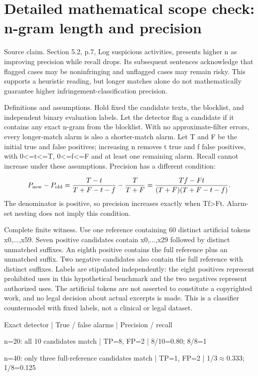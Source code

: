 \documentclass[10pt]{article}
\begin{document}
\section*{Detailed mathematical scope check: n-gram length and precision}
Source claim. Section 5.2, p.7, Log suspicious activities, presents higher n as improving precision while recall drops. Its subsequent sentences acknowledge that flagged cases may be noninfringing and unflagged cases may remain risky. This supports a heuristic reading, but longer matches alone do not mathematically guarantee higher infringement-classification precision.\par
Definitions and assumptions. Hold fixed the candidate texts, the blocklist, and independent binary evaluation labels. Let the detector flag a candidate if it contains any exact n-gram from the blocklist. With no approximate-filter errors, every longer-match alarm is also a shorter-match alarm. Let T and F be the initial true and false positives; increasing n removes t true and f false positives, with 0<=t<=T, 0<=f<=F and at least one remaining alarm. Recall cannot increase under these assumptions. Precision has a different condition:\par
\[P_{\rm new}-P_{\rm old}=\frac{T-t}{T+F-t-f}-\frac{T}{T+F}=\frac{Tf-Ft}{(T+F)(T+F-t-f)}.\] The denominator is positive, so precision increases exactly when Tf>Ft. Alarm-set nesting does not imply this condition.\par
Complete finite witness. Use one reference containing 60 distinct artificial tokens x0,\(\ldots\),x59. Seven positive candidates contain x0,\(\ldots\),x29 followed by distinct unmatched suffixes. An eighth positive contains the full reference plus an unmatched suffix. Two negative candidates also contain the full reference with distinct suffixes. Labels are stipulated independently: the eight positives represent prohibited uses in this hypothetical benchmark and the two negatives represent authorized uses. The artificial tokens are not asserted to constitute a copyrighted work, and no legal decision about actual excerpts is made. This is a classifier countermodel with fixed labels, not a clinical or legal dataset.\par
Exact detector | True / false alarms | Precision / recall\par
n=20: all 10 candidates match | TP=8, FP=2 | 8/10=0.80; 8/8=1\par
n=40: only three full-reference candidates match | TP=1, FP=2 | 1/3\(\approx\)0.333; 1/8=0.125\par
\end{document}
